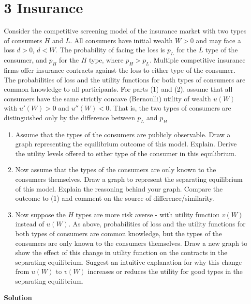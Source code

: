 \documentclass[a4paper]{article}
\begin{document}
\section*{3 Insurance}
Consider the competitive screening model of the insurance market with two types of
consumers $H$ and $L$. All consumers have initial wealth $W > 0$ and may face a loss $d > 0$,
$d < W$. The probability of facing the loss is $p_L$ for the $L$ type of the consumer, and
$p_H$ for the $H$ type, where $p_H > p_L$. Multiple competitive insurance firms offer insurance
contracts against the loss to either type of the consumer. The probabilities of loss and the
utility functions for both types of consumers are common knowledge to all participants.
For parts (1) and (2), assume that all consumers have the same strictly concave
(Bernoulli) utility of wealth $u(W)$ with $u'(W) > 0$ and $u''(W) < 0$. That is, the two types
of consumers are distinguished only by the difference between $p_L$ and $p_H$
\begin{enumerate}
	\item  Assume that the types of the consumers are publicly observable. Draw a graph
	representing the equilibrium outcome of this model. Explain. Derive the utility levels offered to either type of the consumer in this equilibrium.
	\item Now assume that the types of the consumers are only known to the consumers themselves. Draw a graph to represent the separating equilibrium of this model. Explain the reasoning behind your graph. Compare the outcome to (1) and comment on
	the source of difference/similarity.
	\item Now suppose the $H$ types are more risk averse - with utility function $v(W)$ instead
	of $u(W)$. As above, probabilities of loss and the utility functions for both types of
	consumers are common knowledge, but the types of the consumers are only known
	to the consumers themselves. Draw a new graph to show the effect of this change in
	utility function on the contracts in the separating equilibrium. Suggest an intuitive
	explanation for why this change from $u(W)$ to $v(W)$ increases or reduces the utility
	for good types in the separating equilibrium.
\end{enumerate}


\textbf{Solution}
\end{document}
